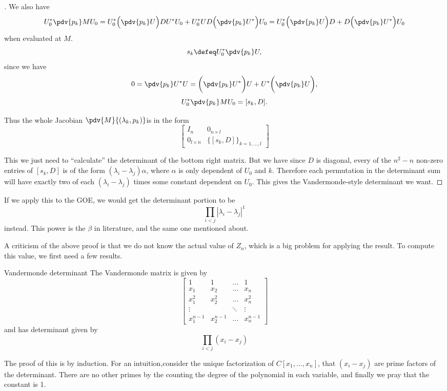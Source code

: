 \begin{proof}[]
    We also have \[
    U_0^*\pdv{p_k} M U_0 =  U_0^*\Big(\pdv{p_k} U \Big) DU^*U_0+ U_0^*UD\Big(\pdv{p_k} U^* \Big)U_0
    =U_0^*\Big(\pdv{p_k} U \Big) D+ D\Big(\pdv{p_k} U^* \Big)U_0
    \]
    when evaluated at $M$. \[
    s_k\defeq U_0^*\pdv{p_k}U,
    \]
    since we have \[
    0 = \pdv{p_k} U^* U =\bigg(\pdv{p_k} U^*\bigg) U  + U^* \bigg(\pdv{p_k}U\bigg),
    \]
    \[
    U_0^*\pdv{p_k} M U_0 = [s_k,D].
    \]

    Thus the whole Jacobian $\pdv{M}{(\lambda_k,p_k)}$is in the form\[
    \begin{bmatrix}
        I_n & 0_{n\times l}\\
        0_{l\times n } &\{[s_k,D]\}_{k=1,...,l}
    \end{bmatrix}    
    \]

    This we just need to ``calculate'' the determinant of the bottom right matrix. But we have since $D$ is diagonal, every of the $n^2-n$ non-zero entries of $[s_k,D]$ is of the form $(\lambda_i - \lambda_j) \alpha$, where $\alpha$ is only dependent of $U_0$ and $k$. Therefore each permutation in the determinant sum will have exactly two of each $(\lambda_i-\lambda_j)$ times some constant dependent on $U_0$. This gives the Vandermonde-style determinant we want.
\end{proof}

\begin{remark}
    If we apply this to the GOE, we would get the determinant portion to be \[
    \prod_{i<j}|\lambda_i - \lambda_j|^1
    \]
    instead. This power is the $\beta$ in literature, and the same one mentioned about. 
\end{remark}

A criticism of the above proof is that we do not know the actual value of $Z_n$, which is a big problem for applying the result. To compute this value, we first need a few results.
\begin{alemma}{Vandermonde determinant}{}
    The Vandermonde matrix is given by \[
    \begin{bmatrix}
        1 & 1 & ... & 1 \\
        x_1 & x_2 & ... & x_n \\ 
        x_1^2& x_2^2 & ... & x_n^2\\
        \vdots & &\ddots&\vdots\\
        x_1^{n-1}&x_2^{n-1}&...&x_n^{n-1}
    \end{bmatrix}
    \]
    and has determinant given by \[
    \prod_{i<j} (x_i-x_j)
    \]
\end{alemma}
The proof of this is by induction. For an intuition,consider the unique factorization of $C[x_1,...,x_n]$, that $(x_i-x_j)$ are prime factors of the determinant. There are no other primes by the counting the degree of the polynomial in each variable, and finally we pray that the constant is 1.

